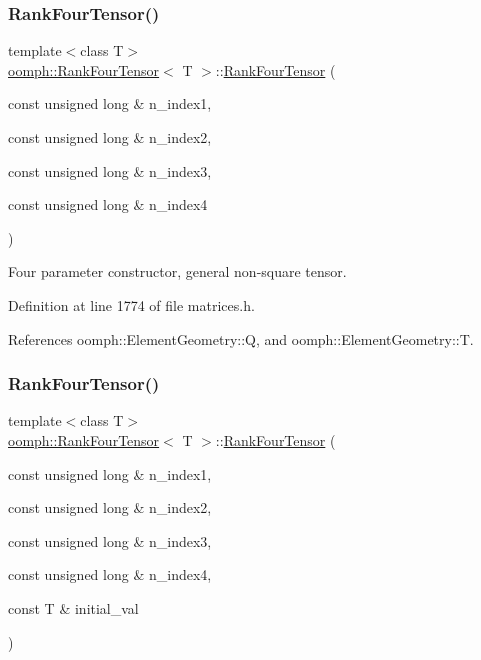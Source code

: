 \subsubsection{\texorpdfstring{Rank\+Four\+Tensor()}{RankFourTensor()}\hspace{0.1cm}{\footnotesize\ttfamily [4/5]}}
{\footnotesize\ttfamily template$<$class T$>$ \\
\hyperlink{classoomph_1_1RankFourTensor}{oomph\+::\+Rank\+Four\+Tensor}$<$ T $>$\+::\hyperlink{classoomph_1_1RankFourTensor}{Rank\+Four\+Tensor} (\begin{DoxyParamCaption}\item[{const unsigned long \&}]{n\+\_\+index1,  }\item[{const unsigned long \&}]{n\+\_\+index2,  }\item[{const unsigned long \&}]{n\+\_\+index3,  }\item[{const unsigned long \&}]{n\+\_\+index4 }\end{DoxyParamCaption})\hspace{0.3cm}{\ttfamily [inline]}}



Four parameter constructor, general non-\/square tensor. 



Definition at line 1774 of file matrices.\+h.



References oomph\+::\+Element\+Geometry\+::Q, and oomph\+::\+Element\+Geometry\+::T.

\mbox{\label{classoomph_1_1RankFourTensor_ac23f09c14842914d318c594a2dd0d424}} 
\subsubsection{\texorpdfstring{Rank\+Four\+Tensor()}{RankFourTensor()}\hspace{0.1cm}{\footnotesize\ttfamily [5/5]}}
{\footnotesize\ttfamily template$<$class T$>$ \\
\hyperlink{classoomph_1_1RankFourTensor}{oomph\+::\+Rank\+Four\+Tensor}$<$ T $>$\+::\hyperlink{classoomph_1_1RankFourTensor}{Rank\+Four\+Tensor} (\begin{DoxyParamCaption}\item[{const unsigned long \&}]{n\+\_\+index1,  }\item[{const unsigned long \&}]{n\+\_\+index2,  }\item[{const unsigned long \&}]{n\+\_\+index3,  }\item[{const unsigned long \&}]{n\+\_\+index4,  }\item[{const T \&}]{initial\+\_\+val }\end{DoxyParamCaption})\hspace{0.3cm}{\ttfamily [inline]}}



